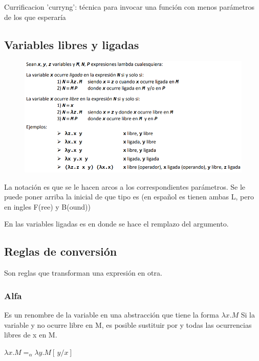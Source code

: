 Currificacion 'curryng': técnica para invocar una función con menos parámetros de los que esperaría


\subsection*{Variables libres y ligadas}
\begin{figure}[!htb]
    \centering
    \includegraphics[width=\textwidth]{img/VariablesLigadas.PNG}
\end{figure}

La notación es que se le hacen arcos a los correspondientes parámetros. Se le puede poner arriba la inicial de que tipo es (en español es tienen ambas L, pero en ingles F(ree) y B(ound))

En las variables ligadas es en donde se hace el remplazo del argumento.

\newpage 

\subsection*{Reglas de conversión}
Son reglas que transforman una expresión en otra.

\subsubsection*{Alfa}
Es un renombre de la variable en una abstracción que tiene la forma $\lambda x.M$
Si la variable y no ocurre libre en M, es posible sustituir por y todas las ocurrencias libres de x en M.

\begin{center}
\begin{math}
\lambda x.M =_{\alpha} \lambda y.M[\,y/x]\,
\end{math}  
\end{center}

